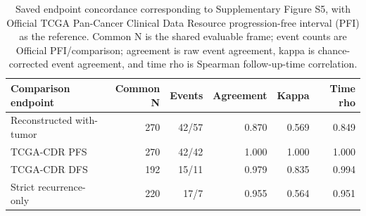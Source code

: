 \begin{table}[htbp]
\centering
\small
\caption{Saved endpoint concordance corresponding to Supplementary Figure S5, with Official TCGA Pan-Cancer Clinical Data Resource progression-free interval (PFI) as the reference. Common N is the shared evaluable frame; event counts are Official PFI/comparison; agreement is raw event agreement, kappa is chance-corrected event agreement, and time rho is Spearman follow-up-time correlation.}
\label{tab:supp-endpoint-concordance}
\begin{tabular}{@{}lrrrrr@{}}
\toprule
Comparison endpoint & Common N & Events & Agreement & Kappa & Time rho \\
\midrule
Reconstructed with-tumor & 270 & 42/57 & 0.870 & 0.569 & 0.849 \\
TCGA-CDR PFS & 270 & 42/42 & 1.000 & 1.000 & 1.000 \\
TCGA-CDR DFS & 192 & 15/11 & 0.979 & 0.835 & 0.994 \\
Strict recurrence-only & 220 & 17/7 & 0.955 & 0.564 & 0.951 \\
\bottomrule
\end{tabular}
\end{table}
